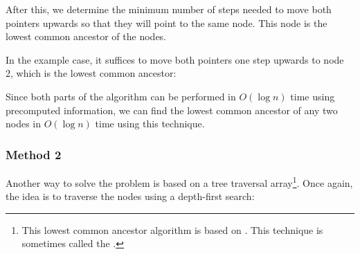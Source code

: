 After this, we determine the minimum number of steps
needed to move both pointers upwards so that
they will point to the same node.
This node is the lowest common ancestor of the nodes.

In the example case, it suffices to move both pointers
one step upwards to node 2,
which is the lowest common ancestor:

\begin{center}
\end{center}

Since both parts of the algorithm can be performed in
$O(\log n)$ time using precomputed information,
we can find the lowest common ancestor of any two
nodes in $O(\log n)$ time using this technique.

\subsubsection{Method 2}

Another way to solve the problem is based on
a tree traversal array\footnote{This lowest common ancestor algorithm is based on \cite{ben00}.
This technique is sometimes called the 
 \cite{tar84}.}.
Once again, the idea is to traverse the nodes
using a depth-first search:

